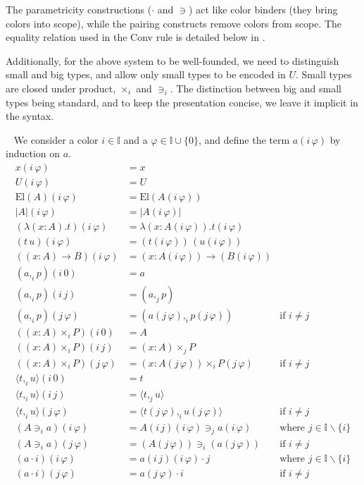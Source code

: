 \documentclass[english]{PaperTools/latex/lipics}
\newcommand\CP[3]{(#2,_{#1} #3)}
\newcommand\CTimes[2]{(#2) ×_{#1}}
\newcommand\op[1]{∋_{#1}}
\newcommand\fp[3]{⟨#2 ,_{#1} #3⟩}
\newcommand\mor[2]{({#1}\,{#2})}
\def\El#1{\mathrm{El}(#1)}
\begin{document}
The parametricity constructions ($·$ and $∋$) act like color
binders (they bring colors into scope), while the pairing constructs
remove colors from scope.
The equality relation used in the {\sc Conv} rule is detailed below in .

Additionally, for the above system to be well-founded, we need to
distinguish small and big types, and allow only small types to be
encoded in $U$. Small types are closed under product, $×_i$ and
$∋_i$. The distinction between big and small types being standard, and
to keep the presentation concise, we leave it implicit in the syntax.

\begin{definition}~
  \label{def:color-erasure}
  We consider a color $i ∈ 𝕀$ and a $φ ∈ 𝕀 ∪ \{0\}$,
  and define the term $a(i\,φ)$ by induction on $a$.
\begin{align*}
  x \mor{i}{φ} & = x \\
  U \mor{i}{φ} & = U \\
  \El{A} \mor{i}{φ} & = \El {A\mor{i}{φ}} \\
  |A| \mor{i}{φ} & = |A\mor{i}{φ}| \\
  (λ(x:A).t)\mor{i}{φ} &= λ(x:A\mor{i}{φ}).t\mor{i}{φ} \\
  (t\,u)\mor{i}{φ} &= (t\mor{i}{φ}) \, (u\mor{i}{φ}) \\
  ((x:A)→B)\mor{i}{φ} &= (x:A\mor{i}{φ})→(B\mor{i}{φ}) \\
  {\CP {i} a p}\mor{i}{0} &= a \\
  {\CP {i} a p}\mor{i}{j} &= \CP {j} a p \\
  {\CP {i} a p}\mor{j}{φ} &= \CP {i} {a\mor{j}{φ}} {p\mor{j}{φ}} &\text{if $i ≠ j$} \\
  (\CTimes {i} {x:A} P)\mor{i}{0} &= A \\
  (\CTimes {i} {x:A} P)\mor{i}{j} &= \CTimes {j} {x:A} P \\
  (\CTimes {i} {x:A} P)\mor{j}{φ} &= \CTimes {i} {x:A\mor{j}{φ}} {P\mor{j}{φ}} &\text{if $i ≠ j$} \\
  {\fp {i} t u}\mor{i}{0} &= t \\
  {\fp {i} t u}\mor{i}{j} &= \fp {j} t u \\
  {\fp {i} t u}\mor{j}{φ} &= \fp {i} {t\mor{j}{φ}} {u\mor{j}{φ}} &\text{if $i ≠ j$} \\
  (A \op {i} a)\mor{i}{φ} &= {A\mor{i}{j}\mor{i}{φ}} \op {j} {a\mor{i}{φ}} &\text{where $j ∈ 𝕀 \backslash\{i\}$} \\
  (A \op {i} a)\mor{j}{φ} &= (A\mor{j}{φ}) \op {i} (a\mor{j}{φ}) &\text{if $i ≠ j$} \\
%
  (a · i)\mor{i}{φ} &= a \mor{i}{j}\mor{i}{φ} · j &\text{where $j ∈ 𝕀 \backslash\{i\}$} \\
  (a · i)\mor{j}{φ} &= a\mor{j}{φ} · i &\text{if $i ≠ j$} \\
  \end{align*}
\end{definition}
\end{document}
